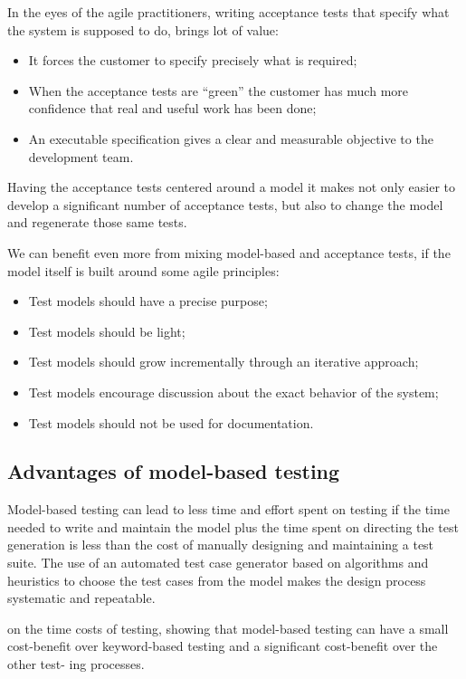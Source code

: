 In the eyes of the agile practitioners, writing acceptance tests
that specify what the system is supposed to do, brings lot of value:
\begin{itemize}
\item It forces the customer to specify precisely what is required;
\item When the acceptance tests are “green” the customer has much 
more confidence that real and useful work has been done;
\item An executable specification gives a clear and measurable 
objective to the development team.
\end{itemize}

Having the acceptance tests centered around a model it makes 
not only easier to develop a significant number of acceptance tests,
but also to change the model and regenerate those same tests.

We can benefit even more from mixing model-based and acceptance tests, if the model itself is built around some agile principles:
\begin{itemize}
\item Test models should have a precise purpose;
\item Test models should be light; 
\item Test models should grow incrementally through an iterative approach;
\item Test models encourage discussion about the exact behavior of the system;
\item Test models should not be used for documentation.
\end{itemize}

\subsection{Advantages of model-based testing}
Model-based testing can lead to less time and effort spent
on testing if the time needed to write and maintain the model 
plus the time spent on directing the test generation is less 
than the cost of manually designing and maintaining a test suite. The use of an automated test case generator based on algorithms and heuristics to choose the test cases from the model makes the design process systematic and repeatable.

 on the time costs of testing, showing that model-based testing can have a small cost-benefit over keyword-based testing and a significant cost-benefit over the other test- ing processes. 

